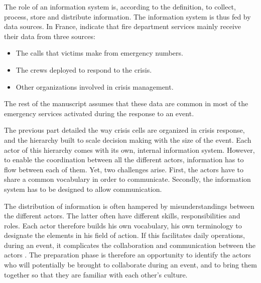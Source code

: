 The role of an information system is, according to the definition, to collect, process, store and distribute information.
The information system is thus fed by data sources.
In France, \textcite{morelEtudePriseDecision2010} indicate that fire department services mainly receive their data from three sources:

\begin{itemize}
    \item The calls that victims make from emergency numbers.
    \item The crews deployed to respond to the crisis.
    \item Other organizations involved in crisis management.
\end{itemize}

The rest of the manuscript assumes that these data are common in most of the emergency services activated during the response to an event.

The previous part detailed the way crisis cells are organized in crisis response, and the hierarchy built to scale decision making with the size of the event.
Each actor of this hierarchy comes with its own, internal information system.
However, to enable the coordination between all the different actors, information has to flow between each of them.
Yet, two challenges arise.
First, the actors have to share a common vocabulary in order to communicate.
Secondly, the information system has to be designed to allow communication.

The distribution of information is often hampered by misunderstandings between the different actors.
The latter often have different skills, responsibilities and roles.
Each actor therefore builds his own vocabulary, his own terminology to designate the elements in his field of action.
If this facilitates daily operations, during an event, it complicates the collaboration and communication between the actors \textcite{opachMapbasedInterfacesCommon2020}.
The preparation phase is therefore an opportunity to identify the actors who will potentially be brought to collaborate during an event, and to bring them together so that they are familiar with each other's culture.


